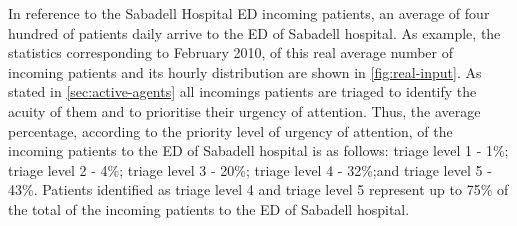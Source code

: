 In reference to the Sabadell Hospital ED incoming patients, an average
of four hundred of patients daily arrive to the ED of Sabadell hospital.
As example, the statistics corresponding to February 2010, of this
real average number of incoming patients and its hourly distribution
are shown in \ref{fig:real-input}. As stated in \ref{sec:active-agents}
all incomings patients are triaged to identify the acuity of them
and to prioritise their urgency of attention. Thus, the average percentage,
according to the priority level of urgency of attention, of the incoming
patients to the ED of Sabadell hospital is as follows: triage level
1 - 1\%; triage level 2 - 4\%; triage level 3 - 20\%; triage level
4 - 32\%;and triage level 5 - 43\%. Patients identified as triage
level 4 and triage level 5 represent up to 75\% of the total of the
incoming patients to the ED of Sabadell hospital.

